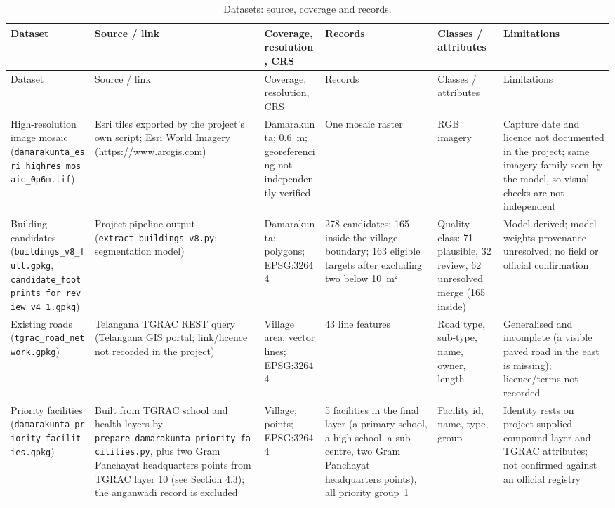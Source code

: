\documentclass[12pt,a4paper]{report}
\begin{document}
\begin{landscape}\footnotesize
\begin{longtable}{@{}L{3.0cm}L{4.2cm}L{3.6cm}L{3.2cm}L{3.2cm}L{4.4cm}@{}}
\caption{Datasets: source, coverage and records.}\label{tab:datasets}\\
\toprule Dataset & Source / link & Coverage, resolution, CRS & Records & Classes / attributes & Limitations\\\midrule\endfirsthead
\toprule Dataset & Source / link & Coverage, resolution, CRS & Records & Classes / attributes & Limitations\\\midrule\endhead
\bottomrule\endfoot
High-resolution image mosaic (\texttt{damarakunta\_esri\_highres\_mosaic\_0p6m.tif}) & Esri tiles exported by the project's own script; Esri World Imagery (\url{https://www.arcgis.com}) & Damarakunta; 0.6~m; georeferencing not independently verified & One mosaic raster & RGB imagery & Capture date and licence not documented in the project; same imagery family seen by the model, so visual checks are not independent\\
Building candidates (\texttt{buildings\_v8\_full.gpkg}, \texttt{candidate\_footprints\_for\_review\_v4\_1.gpkg}) & Project pipeline output (\texttt{extract\_buildings\_v8.py}; segmentation model) & Damarakunta; polygons; EPSG:32644 & 278 candidates; 165 inside the village boundary; 163 eligible targets after excluding two below 10~m$^2$ & Quality class: 71 plausible, 32 review, 62 unresolved merge (165 inside) & Model-derived; model-weights provenance unresolved; no field or official confirmation\\
Existing roads (\texttt{tgrac\_road\_network.gpkg}) & Telangana TGRAC REST query (Telangana GIS portal; link/licence not recorded in the project) & Village area; vector lines; EPSG:32644 & 43 line features & Road type, sub-type, name, owner, length & Generalised and incomplete (a visible paved road in the east is missing); licence/terms not recorded\\
Priority facilities (\texttt{damarakunta\_priority\_facilities.gpkg}) & Built from TGRAC school and health layers by \texttt{prepare\_damarakunta\_priority\_facilities.py}, plus two Gram Panchayat headquarters points from TGRAC layer 10 (see Section 4.3); the anganwadi record is excluded & Village; points; EPSG:32644 & 5 facilities in the final layer (a primary school, a high school, a sub-centre, two Gram Panchayat headquarters points), all priority group~1 & Facility id, name, type, group & Identity rests on project-supplied compound layer and TGRAC attributes; not confirmed against an official registry\\

\end{longtable}
\end{landscape}
\end{document}
